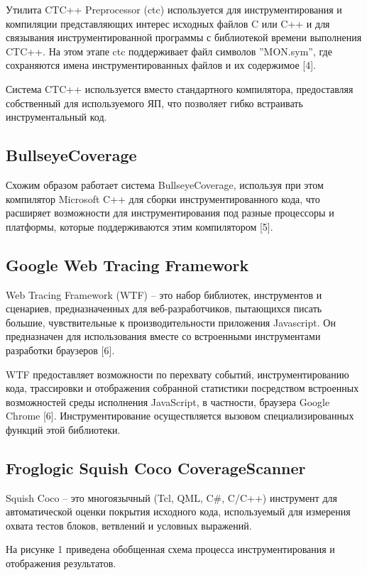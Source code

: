 Утилита CTC++ Preprocessor (ctc) используется для инструментирования и компиляции представляющих интерес исходных файлов C или C++ и для связывания инструментированной программы с библиотекой времени выполнения CTC++. На этом этапе ctc поддерживает файл символов ''MON.sym'', где сохраняются имена инструментированных файлов и их содержимое [4].

Система CTC++ используется вместо стандартного компилятора, предоставляя собственный для используемого ЯП, что позволяет гибко встраивать инструментальный код.

\subsection{BullseyeCoverage}
Схожим образом работает система BullseyeCoverage, используя при этом компилятор Microsoft C++ для сборки инструментированного кода, что расширяет возможности для инструментирования под разные процессоры и платформы, которые поддерживаются этим компилятором [5].

\subsection{Google Web Tracing Framework}
Web Tracing Framework (WTF) -- это набор библиотек, инструментов и сценариев, предназначенных для веб-разработчиков, пытающихся писать большие, чувствительные к производительности приложения Javascript. Он предназначен для использования вместе со встроенными инструментами разработки браузеров [6]. 

WTF предоставляет возможности по перехвату событий, инструментированию кода, трассировки и отображения собранной статистики посредством встроенных возможностей среды исполнения JavaScript, в частности, браузера Google Chrome [6]. Инструментирование осуществляется вызовом специализированных функций этой библиотеки.

\subsection{Froglogic Squish Coco CoverageScanner}
Squish Coco -- это многоязычный (Tcl, QML, C\#, C/C++) инструмент для автоматической оценки покрытия исходного кода, используемый для измерения охвата тестов блоков, ветвлений и условных выражений.

На рисунке 1 приведена обобщенная схема процесса инструментирования и отображения результатов.
 
